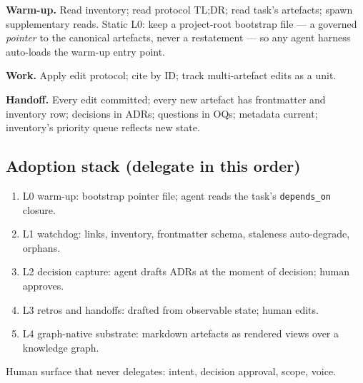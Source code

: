 \documentclass[11pt,a4paper,twocolumn]{article}
\begin{document}
\textbf{Warm-up.} Read inventory; read protocol TL;DR; read task's
artefacts; spawn supplementary reads. Static L0: keep a
project-root bootstrap file --- a governed \emph{pointer} to the
canonical artefacts, never a restatement --- so any agent harness
auto-loads the warm-up entry point.

\textbf{Work.} Apply edit protocol; cite by ID; track multi-artefact
edits as a unit.

\textbf{Handoff.} Every edit committed; every new artefact has
frontmatter and inventory row; decisions in ADRs; questions in OQs;
metadata current; inventory's priority queue reflects new state.

\subsection*{Adoption stack (delegate in this order)}

\begin{enumerate}[nosep,leftmargin=1.2em]
\item L0 warm-up: bootstrap pointer file; agent reads the task's
  \texttt{depends\_on} closure.
\item L1 watchdog: links, inventory, frontmatter schema,
  staleness auto-degrade, orphans.
\item L2 decision capture: agent drafts ADRs at the moment of
  decision; human approves.
\item L3 retros and handoffs: drafted from observable state;
  human edits.
\item L4 graph-native substrate: markdown artefacts as rendered
  views over a knowledge graph.
\end{enumerate}

Human surface that never delegates: intent, decision approval,
scope, voice.
\end{document}
